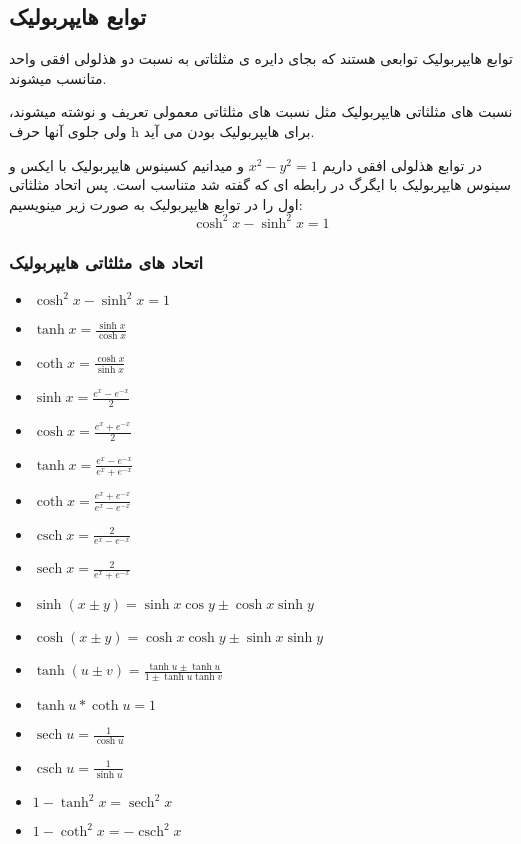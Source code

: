 \documentclass[12pt, a4paper, oneside]{article}
\DeclareMathOperator{\sech}{sech}
\DeclareMathOperator{\csch}{csch}
\begin{document}
\subsection{توابع هایپربولیک}
توابع هایپربولیک توابعی هستند که بجای دایره ی مثلثاتی به نسبت دو هذلولی افقی واحد متانسب میشوند.
 

نسبت های مثلثاتی هایپربولیک مثل نسبت های مثلثاتی معمولی تعریف و نوشته میشوند، ولی جلوی آنها حرف h برای هایپربولیک بودن می آید.

در توابع هذلولی افقی داریم $x^2 - y^2 = 1$ و میدانیم کسینوس هایپربولیک با ایکس و سینوس هایپربولیک با ایگرگ در رابطه ای که گفته شد متناسب است.
پس اتحاد مثلثاتی اول را در توابع هایپربولیک به صورت زیر مینویسیم: 
\[\cosh^2 x - \sinh^2 x = 1\]
\subsubsection{اتحاد های مثلثاتی هایپربولیک}
\begin{latin}
\begin{itemize}
    \item $\cosh^2 x - \sinh^2 x = 1$
    \item $\tanh x = \frac{\sinh x}{\cosh x}$
    \item $\coth x = \frac{\cosh x}{\sinh x}$
    \item $\sinh x = \frac{e^x - e^{-x}}{2}$
    \item $\cosh x = \frac{e^x + e^{-x}}{2}$
    \item $\tanh x = \frac{e^x - e^{-x}}{e^x + e^{-x}}$
    \item $\coth x = \frac{e^x + e^{-x}}{e^x - e^{-x}}$
    \item $\csch x = \frac{ 2 }{ e^x - e^{ -x } }$
    \item $\sech x = \frac{ 2 }{ e^x + e^{ -x } }$
    \item $\sinh(x \pm y) = \sinh x\cos y \pm \cosh x\sinh y$
    \item $\cosh(x \pm y) = \cosh x\cosh y \pm \sinh x\sinh y$
    \item $\tanh(u \pm v) = \frac{ \tanh u \pm \tanh u }{ 1 \pm \tanh u\tanh v }$
    \item $\tanh u * \coth u = 1$
    \item $\sech u = \frac{1}{ \cosh u }$
    \item $\csch u = \frac{1}{\sinh u }$
    \item $1-\tanh^2x = \sech^2x$
    \item $1-\coth^2x = -\csch^2x$
\end{itemize}
\end{latin}
\end{document}
